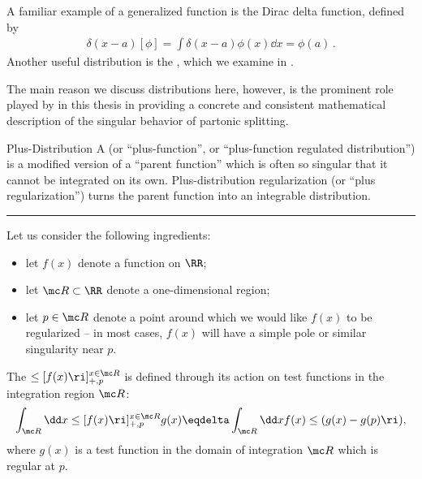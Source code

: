 A familiar example of a generalized function is the Dirac delta function, defined by
\begin{align}
    \delta(x-a)[\phi] = \int \delta(x-a)\phi(x) \dd x = \phi(a)
    \,.
\end{align}
%
Another useful distribution is the , which we examine in .


The main reason we discuss distributions here, however, is the prominent role played by  in this thesis in providing a concrete and consistent mathematical description of the singular behavior of partonic splitting.

\begin{definitionbox}{
Plus-Distribution
}{}
    A  (or ``plus-function'', or ``plus-function regulated distribution'') is a modified version of a ``parent function'' which is often so singular that it cannot be integrated on its own.
    Plus-distribution regularization (or ``plus regularization'') turns the parent function into an integrable distribution.

    \vspace{7pt}
    \hrule
    \vspace{7pt}

    Let us consider the following ingredients:
    \begin{itemize}
        \item
            let \(f(x)\) denote a function on \(\RR\);
        \item
            let \(\mc R \subset \RR\) denote a one-dimensional region;

        \item
            let \(p \in \mc R\) denote a point around which we would like \(f(x)\) to be regularized -- in most cases, \(f(x)\) will have a simple pole or similar singularity near \(p\).
    \end{itemize}

    The  \(\le[f(x)\ri]_{+,p}^{x \in \mc R}\) is defined through its action on test functions in the integration region \(\mc R\):
    \begin{equation}
        \int_{\mc R} \dd x\le[f(x)\ri]_{+,p}^{x \in \mc R} g(x) \eqdelta \int_{\mc R} \dd x f(x) \le(g(x) - g(p)\ri)
        ,
    \end{equation}
    where \(g(x)\) is a test function in the domain of integration \(\mc R\) which is regular at \(p\).
\end{definitionbox}

